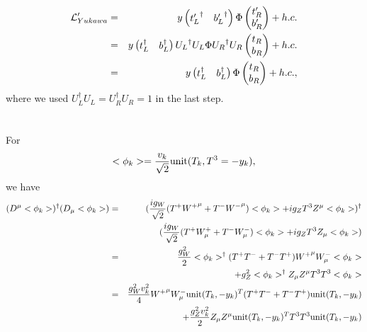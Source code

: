 \documentclass[11pt]{article}
\begin{document}
\begin{eqnarray}
    {\cal L}'_{Yukawa} &=& y 
    \begin{pmatrix}
      {t_L'}^\dagger & {b_L'}^\dagger
    \end{pmatrix}
    \Phi
    \begin{pmatrix}
      t_R' \\ b_R'
    \end{pmatrix} +h.c. \\
    &=&y  
        \begin{pmatrix}
        t_L^\dagger & b_L^\dagger 
        \end{pmatrix}
        {U_L}^\dagger U_L \Phi {U_R}^\dagger U_R    
         \begin{pmatrix}
            t_R \\ b_R
          \end{pmatrix} +h.c.\\
    &=& y 
    \begin{pmatrix}
      t_L^\dagger & b_L^\dagger
    \end{pmatrix}
    \Phi
    \begin{pmatrix}
      t_R \\ b_R
    \end{pmatrix} +h.c.,
\end{eqnarray}
where we used $U_L^\dagger U_L=U_R^\dagger U_R=1$ in the last step.

\section{ }
For
\begin{eqnarray}
    <\phi_k> = \frac{v_k}{\sqrt{2}} {\rm unit}(T_k,T^3=-y_k),
\end{eqnarray}
we have
\begin{eqnarray}
    (D^\mu <\phi_k>)^\dagger (D_\mu <\phi_k>)
    &=& (\frac{ig_W}{\sqrt2} (T^+ {W^+}^\mu + T^- {W^-}^\mu) <\phi_k>
    + ig_Z       T^3 Z^\mu<\phi_k>)^\dagger \nonumber \\ 
    && (\frac{ig_W}{\sqrt2} (T^+ W^+_\mu + T^- W^-_\mu) <\phi_k>
    + ig_Z       T^3 Z_\mu<\phi_k>) \\
    &=& \frac{g_W^2}{2}<\phi_k>^\dagger(T^+T^-+T^-T^+){W^+}^\mu W^-_\mu<\phi_k> \nonumber \\
    && +g_Z^2 <\phi_k>^\dagger Z_\mu Z^\mu T^3T^3 <\phi_k> \\
    &=&\frac{g_W^2 v_k^2}{4}{W^+}^\mu W^-_\mu {\rm unit}(T_k,-y_k)^T (T^+T^-+T^-T^+) {\rm unit}(T_k,-y_k) \nonumber \\
    && +\frac{g_Z^2 v_k^2}{2}Z_\mu Z^\mu {\rm unit}(T_k,-y_k)^T T^3T^3  {\rm unit}(T_k,-y_k)
  \end{eqnarray}
\end{document}
